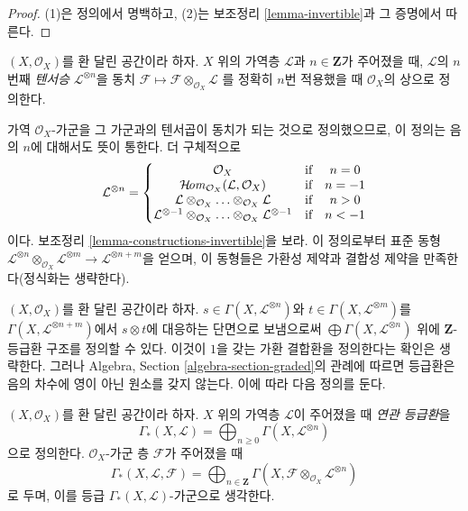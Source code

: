 \begin{proof}
(1)은 정의에서 명백하고, (2)는 보조정리 \ref{lemma-invertible}과
그 증명에서 따른다.
\end{proof}

\begin{definition}
\label{definition-powers}
$(X, \mathcal{O}_X)$를 환 달린 공간이라 하자. $X$ 위의 가역층
$\mathcal{L}$과 $n \in \mathbf{Z}$가 주어졌을 때, $\mathcal{L}$의
$n$번째 {\it 텐서승} $\mathcal{L}^{\otimes n}$을 동치
$\mathcal{F} \mapsto\mathcal{F} \otimes_{\mathcal{O}_X} \mathcal{L}$
를 정확히 $n$번 적용했을 때 $\mathcal{O}_X$의 상으로 정의한다.
\end{definition}

\noindent
가역 $\mathcal{O}_X$-가군을 그 가군과의 텐서곱이 동치가 되는 것으로
정의했으므로, 이 정의는 음의 $n$에 대해서도 뜻이 통한다.
더 구체적으로
$$
\mathcal{L}^{\otimes n} =
\left\{
\begin{matrix}
\mathcal{O}_X & \text{if} & n = 0 \\
\mathop{\mathcal{H}\!\mathit{om}}\nolimits_{\mathcal{O}_X}(\mathcal{L}, \mathcal{O}_X) & \text{if} & n = -1\\
\mathcal{L} \otimes_{\mathcal{O}_X} \ldots \otimes_{\mathcal{O}_X} \mathcal{L}
& \text{if} & n > 0 \\
\mathcal{L}^{\otimes -1} \otimes_{\mathcal{O}_X} \ldots
\otimes_{\mathcal{O}_X} \mathcal{L}^{\otimes -1}
& \text{if} & n < -1
\end{matrix}
\right.
$$
이다. 보조정리 \ref{lemma-constructions-invertible}을 보라.
이 정의로부터 표준 동형
$\mathcal{L}^{\otimes n} \otimes_{\mathcal{O}_X}
\mathcal{L}^{\otimes m} \to
\mathcal{L}^{\otimes n + m}$을 얻으며, 이 동형들은 가환성 제약과
결합성 제약을 만족한다(정식화는 생략한다).

\medskip\noindent
$(X, \mathcal{O}_X)$를 환 달린 공간이라 하자.
$s \in \Gamma(X, \mathcal{L}^{\otimes n})$와
$t \in \Gamma(X, \mathcal{L}^{\otimes m})$를
$\Gamma(X, \mathcal{L}^{\otimes n + m})$에서 $s \otimes t$에 대응하는
단면으로 보냄으로써
$\bigoplus \Gamma(X, \mathcal{L}^{\otimes n})$ 위에
$\mathbf{Z}$-등급환 구조를 정의할 수 있다.
이것이 $1$을 갖는 가환 결합환을 정의한다는 확인은 생략한다.
그러나 Algebra, Section \ref{algebra-section-graded}의 관례에 따르면
등급환은 음의 차수에 영이 아닌 원소를 갖지 않는다.
이에 따라 다음 정의를 둔다.

\begin{definition}
\label{definition-gamma-star}
$(X, \mathcal{O}_X)$를 환 달린 공간이라 하자.
$X$ 위의 가역층 $\mathcal{L}$이 주어졌을 때 {\it 연관 등급환}을
$$
\Gamma_*(X, \mathcal{L})
=
\bigoplus\nolimits_{n \geq 0} \Gamma(X, \mathcal{L}^{\otimes n})
$$
으로 정의한다. $\mathcal{O}_X$-가군 층 $\mathcal{F}$가 주어졌을 때
$$
\Gamma_*(X, \mathcal{L}, \mathcal{F})
=
\bigoplus\nolimits_{n \in \mathbf{Z}} \Gamma(X,
\mathcal{F} \otimes_{\mathcal{O}_X} \mathcal{L}^{\otimes n})
$$
로 두며, 이를 등급 $\Gamma_*(X, \mathcal{L})$-가군으로 생각한다.
\end{definition}

